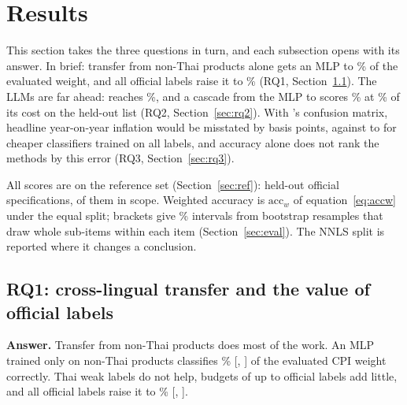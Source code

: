 \section{Results}\label{sec:results}

This section takes the three questions in turn, and each subsection opens with its answer.
In brief: transfer from non-Thai products alone gets an \NameEfive{} MLP to
\AccWEfiveMLPZeroShot\% of the evaluated weight, and all official labels raise it to
\AccWEfiveMLP\% (RQ1, Section~\ref{sec:rq1}). The LLMs are far ahead: \NameOpus{} reaches
\AccWOpus\%, and a cascade from the \NameEfive{} MLP to \NameOpus{} scores
\AccWCasEfiveMLPOpus\% at \CostPctCasEfiveMLPOpus\% of its cost on the held-out list (RQ2,
Section~\ref{sec:rq2}). With \NameOpus's confusion matrix, headline year-on-year inflation
would be misstated by \BpYoyRmseHeadlineOpus{} basis points, against
\BpYoyRmseHeadlineBgeMLP{} to \BpYoyRmseHeadlineEfiveMLP{} for cheaper classifiers trained on
all labels, and accuracy alone does not rank the methods by this error (RQ3,
Section~\ref{sec:rq3}).

All scores are on the reference set (Section~\ref{sec:ref}): \NRefSpecs{} held-out official
specifications, \NRefInScope{} of them in scope. Weighted accuracy is $\mathrm{acc}_w$ of
equation~\eqref{eq:accw} under the equal split; brackets give \CfgCI\% intervals from
\NBoot{} bootstrap resamples that draw whole sub-items within each item
(Section~\ref{sec:eval}). The NNLS split is reported where it changes a conclusion.

\subsection{RQ1: cross-lingual transfer and the value of official labels}\label{sec:rq1}

\textbf{Answer.} Transfer from non-Thai products does most of the work. An \NameEfive{} MLP
trained only on non-Thai products classifies \AccWEfiveMLPZeroShot\%
[\AccWEfiveMLPZeroShotLo, \AccWEfiveMLPZeroShotHi] of the evaluated CPI weight correctly.
Thai weak labels do not help, budgets of up to \CfgBudgetMax{} official labels add little,
and all \NMocTrainval{} official labels raise it to \AccWEfiveMLP\%
[\AccWEfiveMLPLo, \AccWEfiveMLPHi].

